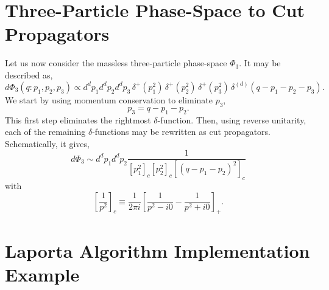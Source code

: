 \section{Three-Particle Phase-Space to Cut Propagators}\label{sec:PhiToCuts}

Let us now consider the massless three-particle phase-space $\Phi_3$. 
It may be described as,
\begin{equation}
    d\Phi_3(q:p_1,p_2,p_3)\propto d^dp_1 d^dp_2 d^dp_3\,\delta^+\!\left(p_1^2\right)\,\delta^+\!\left(p_2^2\right)\,\delta^+\!\left(p_3^2\right)\,\delta^{(d)}(q-p_1-p_2-p_3).
\end{equation}
We start by using momentum conservation to eliminate $p_3$,
\begin{equation}
    p_3 = q - p_1 - p_2.
\end{equation}
This first step eliminates the rightmost $\delta$-function.
Then, using reverse unitarity, each of the remaining $\delta$-functions may be 
rewritten as cut propagators. Schematically, it gives,
\begin{equation}
    d\Phi_3\sim d^dp_1 d^dp_2 \frac1{[p_1^2]_c[p_2^2]_c[(q-p_1-p_2)^2]_c}
\end{equation}
with
\begin{equation}
    \left[\frac1{p^2}\right]_c\equiv \frac1{2\pi i}\left[\frac1{p^2-i0}-\frac1{p^2+i0}\right]_+.
\end{equation}

\section{Laporta Algorithm Implementation Example}\label{sec:laportaByHand}

